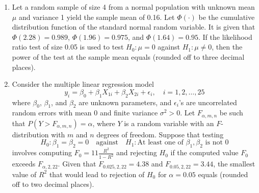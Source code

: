 \documentclass[journal,12pt,onecolumn]{IEEEtran}
\theoremstyle{remark}
\begin{document}
\begin{enumerate}
    \item Let a random sample of size 4 from a normal population with unknown mean $\mu$ and variance 1 yield the sample mean of 0.16. Let $\Phi(\cdot)$ be the cumulative distribution function of the standard normal random variable. It is given that $\Phi(2.28) = 0.989$, $\Phi(1.96) = 0.975$, and $\Phi(1.64) = 0.95$. If the likelihood ratio test of size 0.05 is used to test $H_0: \mu = 0$ against $H_1: \mu \neq 0$, then the power of the test at the sample mean equals  {\underline{\hspace{2cm}}}  (rounded off to three decimal places).

    \item Consider the multiple linear regression model
\[
    y_i = \beta_0 + \beta_1 X_{1i} + \beta_2 X_{2i} + \epsilon_i, \quad i = 1, 2, \dots, 25
\]
    where $\beta_0$, $\beta_1$, and $\beta_2$ are unknown parameters, and $\epsilon_i$'s are uncorrelated random errors with mean 0 and finite variance $\sigma^2 > 0$. Let $F_{\alpha, m, n}$ be such that $P(Y > F_{\alpha, m, n}) = \alpha$, where $Y$ is a random variable with an $F$-distribution with $m$ and $n$ degrees of freedom. Suppose that testing
\[
    H_0: \beta_1 = \beta_2 = 0 \quad \text{against} \quad H_1: \text{At least one of } \beta_1, \beta_2 \text{ is not 0}
\]
    involves computing $F_0 = 11\frac{R^2}{1 - R^2}$ and rejecting $H_0$ if the computed value $F_0$ exceeds $F_{\alpha, 2, 22}$. Given that $F_{0.025, 2, 22} = 4.38$ and $F_{0.05, 2, 22} = 3.44$, the smallest value of $R^2$ that would lead to rejection of $H_0$ for $\alpha = 0.05$ equals  {\underline{\hspace{2cm}}}  (rounded off to two decimal places).

    
\end{enumerate}









  
\end{document}
